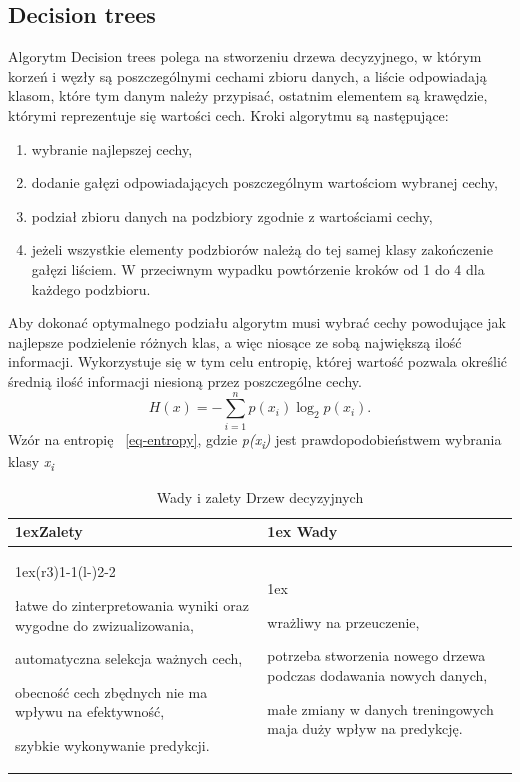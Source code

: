 \subsection{Decision trees}

Algorytm Decision trees polega na stworzeniu drzewa decyzyjnego, w którym korzeń i węzły
są poszczególnymi cechami zbioru danych, a liście odpowiadają klasom, które tym danym 
należy przypisać, ostatnim elementem są krawędzie, którymi reprezentuje się wartości cech. 
Kroki algorytmu są następujące:
\begin{enumerate}
    \item wybranie najlepszej cechy,
    \item dodanie gałęzi odpowiadających poszczególnym wartościom wybranej cechy,
    \item podział zbioru danych na podzbiory zgodnie z wartościami cechy,
    \item jeżeli wszystkie elementy podzbiorów należą do tej samej klasy 
    zakończenie gałęzi liściem. W przeciwnym wypadku powtórzenie kroków 
    od 1 do 4 dla każdego podzbioru.
\end{enumerate}
Aby dokonać optymalnego podziału algorytm musi wybrać cechy powodujące jak najlepsze
podzielenie różnych klas, a więc niosące ze sobą największą ilość informacji.
Wykorzystuje się w tym celu entropię, której wartość pozwala określić średnią ilość 
informacji niesioną przez poszczególne cechy.
\begin{equation}
    H(x)=-\sum_{i=1}^n p(x_i) \log_2 p(x_i).
    \label{eq-entropy}
\end{equation}
Wzór na entropię ~\ref{eq-entropy}, gdzie \textit{p(x\textsubscript{i})} jest prawdopodobieństwem
wybrania klasy \textit{x\textsubscript{i}}
\begin{table}[h]
    \begin{tabularx}{\linewidth}{>{\parskip1ex}X@{\kern4\tabcolsep}>{\parskip1ex}X}
    \toprule
    \hfil\bfseries Zalety
    &
    \hfil\bfseries Wady
    \\\cmidrule(r{3\tabcolsep}){1-1}\cmidrule(l{-\tabcolsep}){2-2}
    
    łatwe do zinterpretowania wyniki oraz wygodne do zwizualizowania,\par
    automatyczna selekcja ważnych cech,\par 
    obecność cech zbędnych nie ma wpływu na efektywność,\par
    szybkie wykonywanie predykcji.\par
    &
    
    wrażliwy na przeuczenie,\par
    potrzeba stworzenia nowego drzewa podczas dodawania nowych danych,\par
    małe zmiany w danych treningowych maja duży wpływ na predykcję.\par
    
    \\\bottomrule
    \end{tabularx}
    \caption{Wady i zalety Drzew decyzyjnych}
\end{table}

